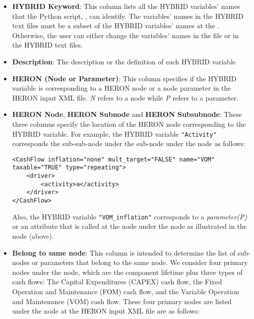 \begin{itemize}
    \item \textbf{HYBRID Keyword}: This column lists all the HYBRID variables' names that the Python script, , can identify. The variables' names in the HYBRID text files must be a subset of the HYBRID variables' names at the . Otherwise, the user can either change the variables' names in the  file or in the HYBRID text files.    
    \item \textbf{Description}: The description or the definition of each HYBRID variable 
    \item \textbf{HERON (Node or Parameter)}: This column specifies if the HYBRID variable is corresponding to a HERON node or a node parameter in the HERON input XML file. \emph{N} refers to a node while \emph{P} refers to a parameter.
    \item \textbf{HERON Node}, \textbf{HERON Subnode} and \textbf{HERON Subsubnode}: These three columns specify the location of the HERON node corresponding to the HYBRID variable. For example, the HYBRID variable \verb|"Activity"| corresponds the sub-sub-node  under the  sub-node under the  node as follows:
    
    \begin{lstlisting}[style=XML,morekeywords={class}]
<CashFlow inflation="none" mult_target="FALSE" name="VOM" taxable="TRUE" type="repeating">
    <driver>
        <activity>a</activity>
    </driver>
</CashFlow>

    \end{lstlisting}
          Also, the HYBRID variable \verb|"VOM_inflation"| corresponds to a \emph{parameter(P)} or an attribute that is called  at the node  under the  node as illustrated in the  node (above).
    
    \item \textbf{Belong to same node}: This column is intended to determine the list of sub-nodes or parameters that belong to the same node. We consider four primary nodes under the  node, which are the component lifetime plus three types of cash flows: The Capital Expenditures (CAPEX) cash flow, the Fixed Operation and Maintenance (FOM) cash flow, and the Variable Operation and Maintenance (VOM) cash flow. These four primary nodes are listed under the  node at the HERON input XML file are as follows:
    

\end{itemize}
